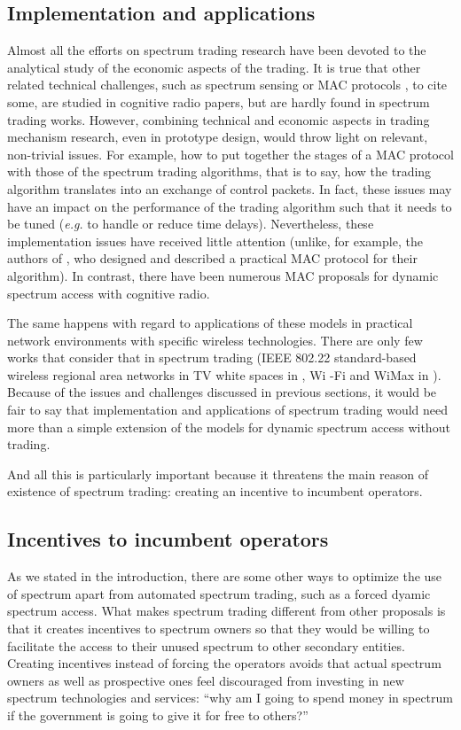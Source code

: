 \subsection{Implementation and applications}
Almost all the efforts on spectrum trading research have been devoted to the analytical study of the economic aspects of the trading. 
It is true that other related technical challenges, such as spectrum sensing or MAC protocols \cite{ref:BWang2011,ref:MAC}, to cite some, are studied in cognitive radio papers, but are hardly found in spectrum trading works. 
However, combining technical and economic aspects in trading mechanism research, even in prototype design, would throw light on relevant, non-trivial issues.
For example, how to put together the stages of a MAC protocol with those of the spectrum trading algorithms, that is to say, how the trading algorithm translates into an exchange of control packets. 
In fact, these issues may have an impact on the performance of the trading algorithm such that it needs to be tuned (\textit{e.g.} to handle or reduce time delays). 
Nevertheless, these implementation issues have received little attention (unlike, for example, the authors of \cite{ref:Wang2008}, who designed and described a practical MAC protocol for their algorithm). 
In contrast, there have been numerous MAC proposals \cite{ref:MAC} for dynamic spectrum access with cognitive radio. 

The same happens with regard to applications of these models in practical network environments with specific wireless technologies. 
There are only few works that consider that in spectrum trading (IEEE 802.22 standard-based wireless regional area networks in TV white spaces in \cite{ref:Niyato2010}, Wi -Fi and WiMax in \cite{ref:802}).
Because of the issues and challenges discussed in previous sections, it would be fair to say that implementation and applications of spectrum trading would need more than a simple extension of the models for dynamic spectrum access without trading.

And all this is particularly important because it threatens the main reason of existence of spectrum trading: creating an incentive to incumbent operators.

\subsection{Incentives to incumbent operators}
As we stated in the introduction, there are some other ways to optimize the use of spectrum apart from automated spectrum trading, such as a forced dyamic spectrum access. What makes spectrum trading different from other proposals is that it creates incentives to spectrum owners so that they would be willing to facilitate the access to their unused spectrum to other secondary entities. 
Creating incentives instead of forcing the operators avoids that actual spectrum owners as well as prospective ones feel discouraged from investing in new spectrum technologies and services: ``why am I going to spend money in spectrum if the government is going to give it for free to others?''

